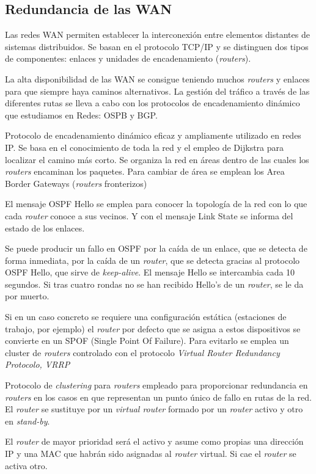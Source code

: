 \subsection{Redundancia de las WAN}
Las redes WAN permiten establecer la interconexión entre elementos distantes de sistemas distribuidos. Se basan en el protocolo TCP/IP y se distinguen dos tipos de componentes: enlaces y unidades de encadenamiento (\textit{routers}).

La alta disponibilidad de las WAN se consigue teniendo muchos \textit{routers} y enlaces para que siempre haya caminos alternativos. La gestión del tráfico a través de las diferentes rutas se lleva a cabo con los protocolos de encadenamiento dinámico que estudiamos en Redes: OSPB y BGP.

\begin{defn}[OSPF]
Protocolo de encadenamiento dinámico eficaz y ampliamente utilizado en redes IP. Se basa en el conocimiento de toda la red y el empleo de Dijkstra para localizar el camino más corto. Se organiza la red en áreas dentro de las cuales los \textit{routers} encaminan los paquetes. Para cambiar de área se emplean los Area Border Gateways (\textit{routers} fronterizos)

El mensaje OSPF Hello se emplea para conocer la topología de la red con lo que cada \textit{router} conoce a sus vecinos. Y con el mensaje Link State se informa del estado de los enlaces.
\end{defn}

Se puede producir un fallo en OSPF por la caída de un enlace, que se detecta de forma inmediata, por la caída de un \textit{router}, que se detecta gracias al protocolo OSPF Hello, que sirve de \textit{keep-alive}. El mensaje Hello se intercambia cada 10 segundos. Si tras cuatro rondas no se han recibido Hello's de un \textit{router}, se le da por muerto.

Si en un caso concreto se requiere una configuración estática (estaciones de trabajo, por ejemplo) el \textit{router} por defecto que se asigna a estos dispositivos se convierte en un SPOF (Single Point Of Failure). Para evitarlo se emplea un cluster de \textit{routers} controlado con el protocolo \textit{Virtual Router Redundancy Protocolo, VRRP}

\begin{defn}[VRRP]
Protocolo de \textit{clustering} para \textit{routers} empleado para proporcionar redundancia en \textit{routers} en los casos en que representan un punto único de fallo en rutas de la red. El \textit{router} se sustituye por un \textit{virtual \textit{router}} formado por un \textit{router} activo y otro en \textit{stand-by}.

El \textit{router} de mayor prioridad será el activo y asume como propias una dirección IP y una MAC que habrán sido asignadas al \textit{router} virtual. Si cae el \textit{router} se activa otro.
\end{defn}

